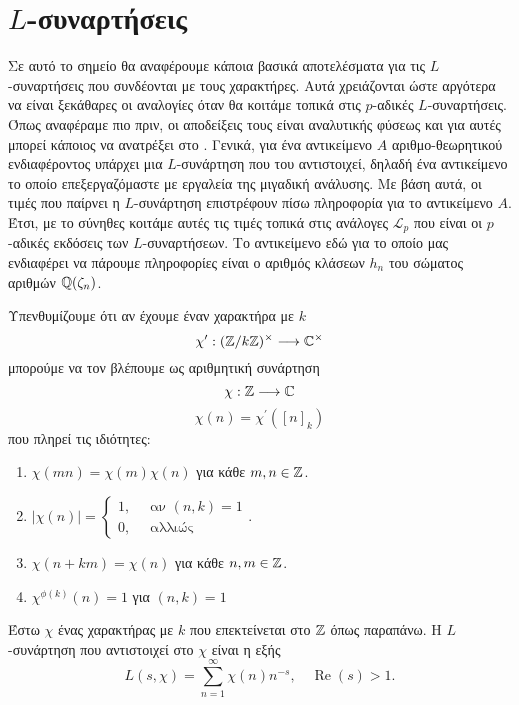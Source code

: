 \section{$L$-συναρτήσεις}

Σε αυτό το σημείο θα αναφέρουμε κάποια βασικά αποτελέσματα για τις $L$-συναρτήσεις που συνδέονται με τους χαρακτήρες. 
Αυτά χρειάζονται ώστε αργότερα να είναι ξεκάθαρες οι αναλογίες όταν θα κοιτάμε τοπικά στις $p$-αδικές $L$-συναρτήσεις. Όπως αναφέραμε πιο πριν, 
οι αποδείξεις τους είναι αναλυτικής φύσεως και για αυτές μπορεί κάποιος να ανατρέξει στο \cite{Wash}. Γενικά, για ένα αντικείμενο $A$ αριθμο-θεωρητικού 
ενδιαφέροντος υπάρχει μια $L$-συνάρτηση που του αντιστοιχεί, δηλαδή ένα αντικείμενο το οποίο επεξεργαζόμαστε με εργαλεία της μιγαδική ανάλυσης. 
Με βάση αυτά, οι τιμές που παίρνει η $L$-συνάρτηση επιστρέφουν πίσω πληροφορία για το αντικείμενο $A$. Έτσι, με το σύνηθες  
κοιτάμε αυτές τις τιμές τοπικά στις ανάλογες $\mathcal{L}_p$ που είναι οι $p$-αδικές εκδόσεις των $L$-συναρτήσεων. Το αντικείμενο εδώ για το οποίο μας 
ενδιαφέρει να πάρουμε πληροφορίες είναι ο αριθμός κλάσεων $h_n$ του σώματος αριθμών $\mathbb{Q}(\zeta_n)$. 

Υπενθυμίζουμε ότι αν έχουμε έναν χαρακτήρα  με  $k$
$$\chi^{\prime}: (\mathbb{Z}/k\mathbb{Z})^\times \longrightarrow \mathbb{C}^\times$$ μπορούμε να τον βλέπουμε ως αριθμητική συνάρτηση
$$\chi:\mathbb{Z}\longrightarrow \mathbb{C}$$
$$\chi(n) = \chi^{\prime}([n]_k)$$ που πληρεί τις ιδιότητες:
\begin{enumerate}
	\item $\chi(mn) = \chi(m)\chi(n)$ για κάθε $m,n \in \mathbb{Z}$.
	\item $|\chi(n)| = \begin{cases} 1, \quad \text{ αν } (n,k)=1 \\ 0, \quad \text{ αλλιώς}\end{cases}$.
	\item $\chi(n+km) = \chi(n)$ για κάθε $n,m \in \mathbb{Z}$.
	\item $\chi^{\phi(k)}(n) = 1$ για $(n,k)=1$
\end{enumerate}

\begin{defn} Έστω $\chi$ ένας χαρακτήρας  με  $k$ που επεκτείνεται στο $\mathbb{Z}$ όπως παραπάνω. Η $L$-συνάρτηση που αντιστοιχεί στο $\chi$ είναι η εξής
	$$L(s,\chi) = \sum\limits_{n=1}^\infty \chi(n)n^{-s}, \quad \operatorname{Re}(s)>1.$$
\end{defn}

